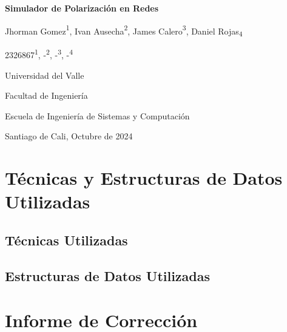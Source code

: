\documentclass{article}
\begin{document}
\begin{titlepage}
  \centering
  \vspace*{2cm}
  
  \Huge
  \textbf{Simulador de Polarización en Redes}
  
  \vspace{1.5cm}
  
  \Large
  Jhorman Gomez{\textsuperscript{1}}, Ivan Ausecha{\textsuperscript{2}}, James Calero{\textsuperscript{3}}, Daniel Rojas{\textsubscript{4}}
  
  \vspace{0.5cm}
  
  \large
  2326867{\textsuperscript{1}}, -{\textsuperscript{2}}, -{\textsuperscript{3}}, -{\textsuperscript{4}}
  
  \vspace{0.5cm}
  
  \Large
  Universidad del Valle
  
  \vspace{0.5cm}
  
  \large
  Facultad de Ingeniería
  
  \vspace{0.5cm}
  
  \large
  Escuela de Ingeniería de Sistemas y Computación
  
  \vspace{0.5cm}
  
  \large
  Santiago de Cali, Octubre de 2024
  
\end{titlepage}

\section{Técnicas y Estructuras de Datos Utilizadas}

\subsection{Técnicas Utilizadas}

\subsection{Estructuras de Datos Utilizadas}

\section{Informe de Corrección}
\end{document}
